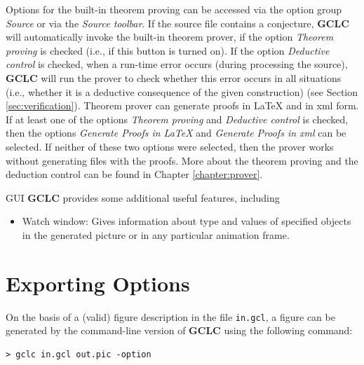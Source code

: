 \documentclass[a4paper]{book}
\newcommand{\gclc}{{\bfseries GCLC}\xspace}
\begin{document}
\begin{description}
\item[Theorem proving:] Options for the built-in theorem proving can
be accessed via the option group {\it Source} or via the {\it Source
toolbar}. If the source file contains a conjecture, \gclc will
automatically invoke the built-in theorem prover, if the option
{\it Theorem proving} is checked (i.e., if this button is turned on).
If the option {\it Deductive control} is checked, when a run-time
error occurs (during processing the source), \gclc will run the
prover to check whether this error occurs in all situations (i.e.,
whether it is a deductive consequence of the given construction)
(see Section \ref{sec:verification}).
Theorem prover can generate proofs in \LaTeX{} and in {\sc xml} form.
If at least one of the options {\it Theorem proving} and
{\it Deductive control} is checked, then the options {\it Generate Proofs
in \LaTeX{}} and {\it Generate Proofs in {\sc xml}} can be selected.
If neither of these two options were selected, then the prover works
without generating files with the proofs.
More about the theorem proving and the deduction control can be
found in Chapter \ref{chapter:prover}.


\item[Miscellaneous:] GUI \gclc provides some additional useful
features, including 

\begin{itemize}
    \item Watch window: Gives information about type and values of
    specified objects in the generated picture or in any particular
    animation frame.
\end{itemize}

\end{description}


\chapter{Exporting Options}
\label{chapter:export}

On the basis of a (valid) figure description in the file \verb|in.gcl|,
a figure can be generated by the command-line version of \gclc using
the following command:

\begin{verbatim}
> gclc in.gcl out.pic -option
\end{verbatim}
\end{document}
